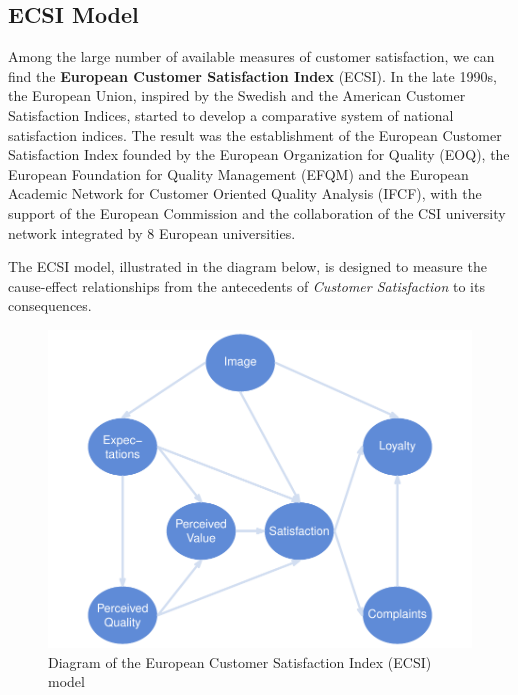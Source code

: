 \documentclass[12pt]{book}\usepackage{graphicx, color}
\newenvironment{knitrout}{}{} %
\begin{document}
\subsection{ECSI Model}
Among the large number of available measures of customer satisfaction, we can find the \textbf{European Customer Satisfaction Index} (ECSI). In the late 1990s, the European Union, inspired by the Swedish and the American Customer Satisfaction Indices, started to develop a comparative system of national satisfaction indices. The result was the establishment of the European Customer Satisfaction Index founded by the European Organization for Quality (EOQ), the European Foundation for Quality Management (EFQM) and the European Academic Network for Customer Oriented Quality Analysis (IFCF), with the support of the European Commission and the collaboration of the CSI university network integrated by 8 European universities. 

The ECSI model, illustrated in the diagram below, is designed to measure the cause-effect relationships from the antecedents of \textit{Customer Satisfaction} to its consequences.



\begin{knitrout}
\color{fgcolor}\begin{figure}[h]


{\centering \includegraphics[width=.95\linewidth,height=.5\linewidth]{figure/ECSI_model_diag} 

}

\caption[Diagram of the European Customer Satisfaction Index (ECSI) model]{Diagram of the European Customer Satisfaction Index (ECSI) model\label{fig:ECSI_model_diag}}
\end{figure}


\end{knitrout}
\end{document}
